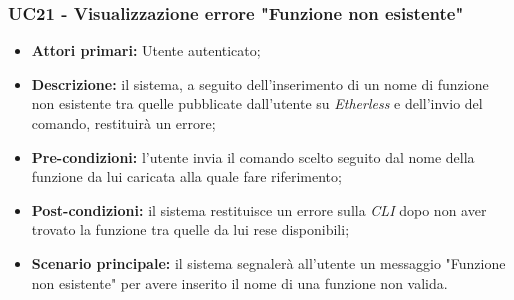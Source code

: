 \subsubsection{UC21 - Visualizzazione errore "Funzione non esistente"}
\begin{itemize}
	\item \textbf{Attori primari:} Utente autenticato;
	\item \textbf{Descrizione:} il sistema, a seguito dell'inserimento di un nome di funzione non esistente tra quelle pubblicate dall'utente su \textit{Etherless} e dell'invio del comando, restituirà un errore;
	\item \textbf{Pre-condizioni:} l'utente invia il comando scelto seguito dal nome della funzione da lui caricata alla quale fare riferimento;
	\item \textbf{Post-condizioni:} il sistema restituisce un errore sulla \textit{CLI\glo} dopo non aver trovato la funzione tra quelle da lui rese disponibili;
	\item \textbf{Scenario principale:} il sistema segnalerà all'utente un messaggio "Funzione non esistente" per avere inserito il nome di una funzione non valida.
\end{itemize}
